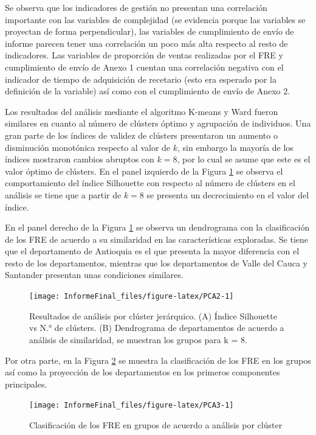 \documentclass[
]{book}
\begin{document}
Se observa que los indicadores de gestión no presentan una correlación importante con las variables de complejidad (se evidencia porque las variables se proyectan de forma perpendicular), las variables de cumplimiento de envío de informe parecen tener una correlación un poco más alta respecto al resto de indicadores. Las variables de proporción de ventas realizadas por el FRE y cumplimiento de envío de Anexo 1 cuentan una correlación negativa con el indicador de tiempo de adquisición de recetario (esto era esperado por la definición de la variable) así como con el cumplimiento de envío de Anexo 2.

Los resultados del análisis mediante el algoritmo K-means y Ward fueron similares en cuanto al número de clústers óptimo y agrupación de individuos. Una gran parte de los índices de validez de clústers presentaron un aumento o disminución monotónica respecto al valor de \(k\), sin embargo la mayoría de los índices mostraron cambios abruptos con \(k=8\), por lo cual se asume que este es el valor óptimo de clústers. En el panel izquierdo de la Figura \ref{fig:PCA2} se observa el comportamiento del índice Silhouette con respecto al número de clústers en el análisis se tiene que a partir de \(k=8\) se presenta un decrecimiento en el valor del índice.

En el panel derecho de la Figura \ref{fig:PCA2} se observa un dendrograma con la clasificación de los FRE de acuerdo a su similaridad en las características exploradas. Se tiene que el departamento de Antioquia es el que presenta la mayor diferencia con el resto de los departamentos, mientras que los departamentos de Valle del Cauca y Santander presentan unas condiciones similares.

\begin{figure}[t]

{\centering \texttt{[image: InformeFinal\_files/figure-latex/PCA2-1]} 

}

\caption{Resultados de análisis por clúster jerárquico. (A) Índice Silhouette vs N.° de clústers. (B) Dendrograma de departamentos de acuerdo a análisis de similaridad, se muestran los grupos para k = 8.}\label{fig:PCA2}
\end{figure}

Por otra parte, en la Figura \ref{fig:PCA3} se muestra la clasificación de los FRE en los grupos así como la proyección de los departamentos en los primeros componentes principales.

\begin{figure}[t]

{\centering \texttt{[image: InformeFinal\_files/figure-latex/PCA3-1]} 

}

\caption{Clasificación de los FRE en grupos de acuerdo a análisis por clúster}\label{fig:PCA3}
\end{figure}
\end{document}
